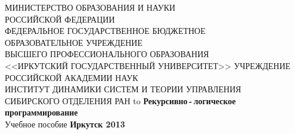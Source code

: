\documentclass[12pt, openany, twoside]{book} %
\begin{document}
\def\chaptername{Тема}
\def\thechapter{\arabic{chapter}}
\def\thefigure{\thechapter.\arabic{figure}}
\def\thetable{\thechapter.\arabic{table}}
\fancyhf{} %
\fancyhead[RE]{\slshape \leftmark}
\fancyhead[LO]{\slshape \rightmark}
\fancyhead[RO,LE]{\slshape \thepage}
\renewcommand{\headrulewidth}{1pt}
\renewcommand{\footrulewidth}{0pt}%
\pagestyle{fancy}
\begin{titlepage}
\thispagestyle{empty}
\begin{center}{\sc
МИНИСТЕРСТВО ОБРАЗОВАНИЯ И НАУКИ \\
РОССИЙСКОЙ ФЕДЕРАЦИИ \\
ФЕДЕРАЛЬНОЕ ГОСУДАРСТВЕННОЕ БЮДЖЕТНОЕ \\
ОБРАЗОВАТЕЛЬНОЕ УЧРЕЖДЕНИЕ \\
ВЫСШЕГО ПРОФЕССИОНАЛЬНОГО ОБРАЗОВАНИЯ\\
<<ИРКУТСКИЙ ГОСУДАРСТВЕННЫЙ УНИВЕРСИТЕТ>>
    УЧРЕЖДЕНИЕ РОССИЙСКОЙ АКАДЕМИИ НАУК \\
ИНСТИТУТ ДИНАМИКИ СИСТЕМ И ТЕОРИИ УПРАВЛЕНИЯ \\
СИБИРСКОГО ОТДЕЛЕНИЯ РАН
}
\vfill
\hbox to \linewidth{\hfill Е.~А.~Черкашин\hfill}
 \vspace{2em}
{\large\bf Рекурсивно\,-\,логическое программирование}\\
{Учебное пособие}
\vfill
\vfill
 \textbf{Иркутск 2013}
\end{center}
\end{titlepage}
\end{document}

